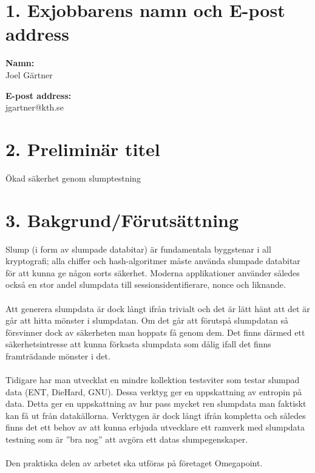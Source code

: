 \documentclass[a4paper,11pt]{report}
\begin{document}
\section*{1. Exjobbarens namn och E-post address}
\begin{minipage}[t]{7cm}
    {\textbf{Namn:}}\\
Joel Gärtner

\end{minipage}
\begin{minipage}[t]{7cm}
    {\textbf{E-post address:}}\\
jgartner@kth.se
\end{minipage}
\section*{2. Preliminär titel}
Ökad säkerhet genom slumptestning
\section*{3. Bakgrund/Förutsättning}
Slump (i form av slumpade databitar) är fundamentala byggstenar i all 
kryptografi; alla chiffer och hash-algoritmer måste använda slumpade 
databitar för att kunna ge någon sorts säkerhet. Moderna applikationer 
använder således också en stor andel slumpdata till sessionsidentifierare,
nonce och liknande. \\
\\
Att generera slumpdata är dock långt ifrån trivialt och det är lätt hänt
att det är går att hitta mönster i slumpdatan. Om det går att förutspå 
slumpdatan så försvinner dock av säkerheten man hoppats få genom dem.
Det finns därmed ett säkerhetsintresse att 
kunna förkasta slumpdata som dålig ifall det finns framträdande mönster i det.\\
\\
Tidigare har man utvecklat en mindre kollektion testsviter som testar 
slumpad data (ENT, DieHard, GNU). Dessa verktyg ger en uppskattning av 
entropin på data.  Detta ger en uppskattning av hur pass mycket ren 
slumpdata man faktiskt kan få ut från datakällorna.
Verktygen är dock långt ifrån kompletta och således finns det ett behov av att
kunna erbjuda utvecklare ett ramverk med slumpdata testning som är ”bra nog” 
att avgöra ett datas slumpegenskaper. \\
\\
Den praktiska delen av arbetet ska utföras på företaget Omegapoint.
\end{document}

